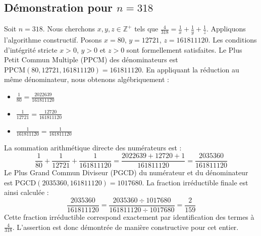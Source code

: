 \documentclass[11pt,a4paper]{article}
\begin{document}
\subsection{Démonstration pour $n = 318$}
Soit $n = 318$. Nous cherchons $x, y, z \in \mathbb{Z}^{+}$ tels que $\frac{4}{318} = \frac{1}{x} + \frac{1}{y} + \frac{1}{z}$.
Appliquons l'algorithme constructif. Posons $x = 80$, $y = 12721$, $z = 161811120$.
Les conditions d'intégrité stricte $x > 0$, $y > 0$ et $z > 0$ sont formellement satisfaites.
Le Plus Petit Commun Multiple (PPCM) des dénominateurs est $\text{PPCM}(80, 12721, 161811120) = 161811120$.
En appliquant la réduction au même dénominateur, nous obtenons algébriquement :
\begin{itemize}
    \item $\frac{1}{80} = \frac{2022639}{161811120}$
    \item $\frac{1}{12721} = \frac{12720}{161811120}$
    \item $\frac{1}{161811120} = \frac{1}{161811120}$
\end{itemize}
La sommation arithmétique directe des numérateurs est :
$$ \frac{1}{80} + \frac{1}{12721} + \frac{1}{161811120} = \frac{2022639 + 12720 + 1}{161811120} = \frac{2035360}{161811120} $$
Le Plus Grand Commun Diviseur (PGCD) du numérateur et du dénominateur est $\text{PGCD}(2035360, 161811120) = 1017680$.
La fraction irréductible finale est ainsi calculée :
$$ \frac{2035360}{161811120} = \frac{2035360 \div 1017680}{161811120 \div 1017680} = \frac{2}{159} $$
Cette fraction irréductible correspond exactement par identification des termes à $\frac{4}{318}$. L'assertion est donc démontrée de manière constructive pour cet entier.
\end{document}
